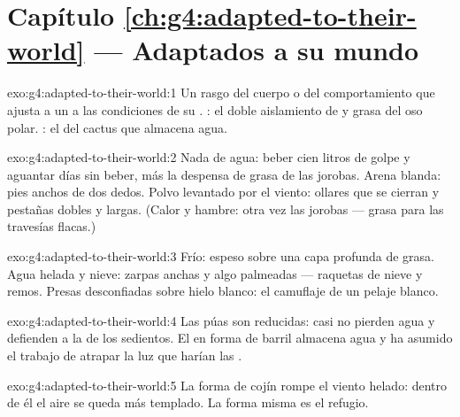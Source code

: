 \section*{Capítulo \ref{ch:g4:adapted-to-their-world} --- Adaptados a su mundo}

\begin{solution}{exo:g4:adapted-to-their-world:1}
Un rasgo del cuerpo o del comportamiento que ajusta a un  a
las condiciones de su . : el doble aislamiento de  y
grasa del oso polar. : el  del cactus que almacena agua.
\end{solution}

\begin{solution}{exo:g4:adapted-to-their-world:2}
Nada de agua: beber cien litros de golpe y aguantar días sin beber,
más la despensa de grasa de las jorobas. Arena blanda: pies anchos de
dos dedos. Polvo levantado por el viento: ollares que se cierran y
pestañas dobles y largas. (Calor y hambre: otra vez las jorobas ---
grasa para las travesías flacas.)
\end{solution}

\begin{solution}{exo:g4:adapted-to-their-world:3}
Frío:  espeso sobre una capa profunda de grasa. Agua helada y
nieve: zarpas anchas y algo palmeadas --- raquetas de nieve y remos.
Presas desconfiadas sobre hielo blanco: el camuflaje de un pelaje
blanco.
\end{solution}

\begin{solution}{exo:g4:adapted-to-their-world:4}
Las púas son  reducidas: casi no pierden agua y defienden a la
 de los  sedientos. El  en forma de barril almacena
agua y ha asumido el trabajo de atrapar la luz que harían las .
\end{solution}

\begin{solution}{exo:g4:adapted-to-their-world:5}
La forma de cojín rompe el viento helado: dentro de él el aire se
queda más templado. La forma misma es el refugio.
\end{solution}

